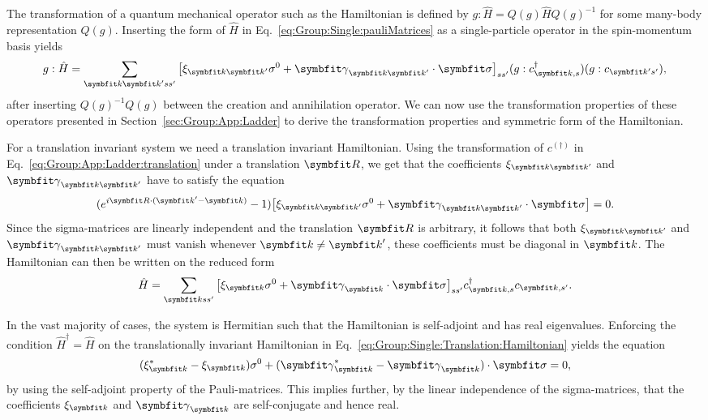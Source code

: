 The transformation of a quantum mechanical operator such as the Hamiltonian is defined by $g:\hat{H} = Q(g)\hat{H}Q(g)^{-1}$ for some many-body
representation $Q(g)$. Inserting the form of $\hat{H}$ in Eq.~\eqref{eq:Group:Single:pauliMatrices} as a single-particle operator in the
spin-momentum basis yields
\begin{equation}
    \label{eq:Group:Single:generalTransformedHamiltonian}
    g:\hat{H} = \sum_{\v{k}\v{k}'ss'}\big[\xi_{\v{k}\v{k}'}\sigma^0 + \v{\gamma}_{\v{k}\v{k}'}\cdot\v{\sigma}\big]_{ss'}(g:c^\dagger_{\v{k},s})(g:c_{\v{k}'s'}),
\end{equation}
after inserting $Q(g)^{-1}Q(g)$ between the creation and annihilation operator. We can now use the transformation properties of these operators presented
in Section~\ref{sec:Group:App:Ladder} to derive the transformation properties and symmetric form of the Hamiltonian.

For a translation invariant system we need a translation invariant Hamiltonian. Using the transformation of $c^{(\dagger)}$ in
Eq.~\eqref{eq:Group:App:Ladder:translation} under a translation $\v{R}$, we get that the coefficients $\xi_{\v{k}\v{k}'}$ and $\v{\gamma}_{\v{k}\v{k}'}$
have to satisfy the equation
\begin{equation}
    \label{eq:Group:Single:Translation:condition}
    (e^{i\v{R}\cdot(\v{k}'-\v{k})}-1)\big[\xi_{\v{k}\v{k}'}\sigma^0 + \v{\gamma}_{\v{k}\v{k}'}\cdot\v{\sigma}\big] = 0.
\end{equation}
Since the sigma-matrices are linearly independent and the translation $\v{R}$ is arbitrary, it follows that both $\xi_{\v{k}\v{k}'}$ and
$\v{\gamma}_{\v{k}\v{k}'}$ must vanish whenever $\v{k}\neq\v{k}'$, \ie these coefficients must be diagonal in $\v{k}$. The Hamiltonian can then be written on the
reduced form
\begin{equation}
    \label{eq:Group:Single:Translation:Hamiltonian}
    \hat{H} = \sum_{\v{k}ss'}\big[\xi_\v{k}\sigma^0 + \v{\gamma}_\v{k}\cdot\v{\sigma}\big]_{ss'}c^{\dagger}_{\v{k},s}c_{\v{k},s'}.
\end{equation}

In the vast majority of cases, the system is Hermitian such that the Hamiltonian is self-adjoint and has real eigenvalues. Enforcing the condition
$\hat{H}^\dagger=\hat{H}$ on the translationally invariant Hamiltonian in Eq.~\eqref{eq:Group:Single:Translation:Hamiltonian} yields the equation
\begin{equation}
    \label{eq:Group:Single:Hermitian:condition}
    (\xi_\v{k}^\ast-\xi_{\v{k}})\sigma^0 + (\v{\gamma}^\ast_\v{k}-\v{\gamma}_\v{k})\cdot\v{\sigma} = 0,
\end{equation}
by using the self-adjoint property of the Pauli-matrices. This implies further, by the linear independence of the sigma-matrices, that the coefficients $\xi_\v{k}$
and $\v{\gamma}_\v{k}$ are self-conjugate and hence real.

